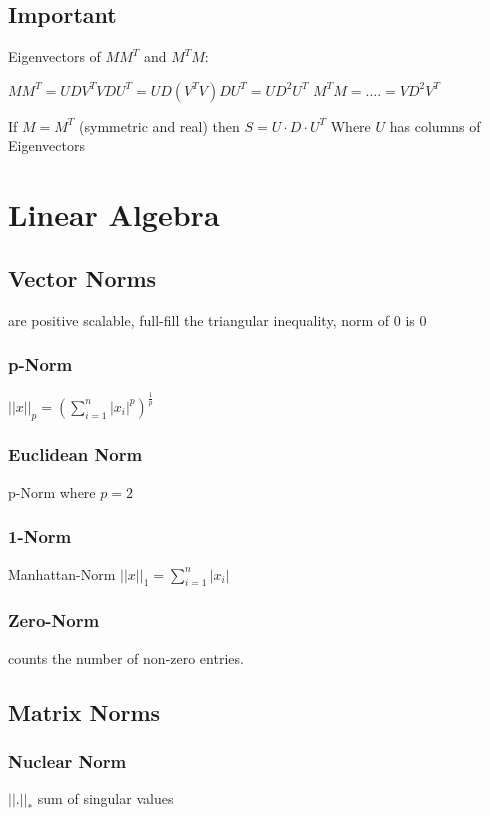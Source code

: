 \documentclass[11pt,twocolumn]{article}
\begin{document}
\subsection{Important} Eigenvectors of $MM^T$ and $M^TM$:


$MM^T = UDV^T VDU^T = UD (V^T V)DU^T = U D^2 U^T$
$M^TM =  ....  = V D^2 V^T$
 
If $M = M^T$ (symmetric and real) then
$S = U \cdot D \cdot U^T$
Where $U$ has columns of Eigenvectors


\section{Linear Algebra}
\subsection{Vector Norms}
are positive scalable, full-fill the triangular inequality, norm of 0 is 0

\subsubsection{p-Norm}
$ || x ||_p = \left( \sum_{i=1}^{n}{|x_i|^p} \right)^{\frac{1}{p}}$

\subsubsection{Euclidean Norm} 
p-Norm where $p=2$

\subsubsection{1-Norm}
Manhattan-Norm
$ ||x||_1 = \sum_{i=1}^{n}{|x_i|} $

\subsubsection{Zero-Norm} 
counts the number of non-zero entries.

\subsection{Matrix Norms}

\subsubsection{Nuclear Norm}

$|| . ||_*$ sum of singular values
\end{document}
